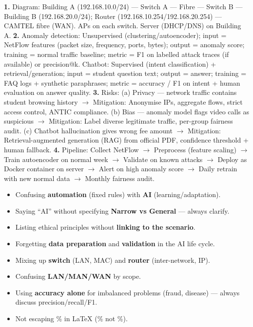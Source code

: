 \documentclass[11pt]{article}
\begin{document}
\begin{corrige}
\textbf{1.} Diagram: Building A (192.168.10.0/24) — Switch A — Fibre — Switch B — Building B (192.168.20.0/24); Router (192.168.10.254/192.168.20.254) — CAMTEL fibre (WAN). APs on each switch. Server (DHCP/DNS) on Building A.
\textbf{2.} Anomaly detection: Unsupervised (clustering/autoencoder); input = NetFlow features (packet size, frequency, ports, bytes); output = anomaly score; training = normal traffic baseline; metric = F1 on labelled attack traces (if available) or precision@k. Chatbot: Supervised (intent classification) + retrieval/generation; input = student question text; output = answer; training = FAQ logs + synthetic paraphrases; metric = accuracy / F1 on intent + human evaluation on answer quality.
\textbf{3.} Risks: (a) Privacy — network traffic contains student browsing history $\rightarrow$ Mitigation: Anonymise IPs, aggregate flows, strict access control, ANTIC compliance. (b) Bias — anomaly model flags video calls as suspicious $\rightarrow$ Mitigation: Label diverse legitimate traffic, per-group fairness audit. (c) Chatbot hallucination gives wrong fee amount $\rightarrow$ Mitigation: Retrieval-augmented generation (RAG) from official PDF, confidence threshold + human fallback.
\textbf{4.} Pipeline: Collect NetFlow $\rightarrow$ Preprocess (feature scaling) $\rightarrow$ Train autoencoder on normal week $\rightarrow$ Validate on known attacks $\rightarrow$ Deploy as Docker container on server $\rightarrow$ Alert on high anomaly score $\rightarrow$ Daily retrain with new normal data $\rightarrow$ Monthly fairness audit.
\end{corrige}

\begin{attention}
\begin{itemize}
\item Confusing \textbf{automation} (fixed rules) with \textbf{AI} (learning/adaptation).
\item Saying ``AI'' without specifying \textbf{Narrow vs General} — always clarify.
\item Listing ethical principles without \textbf{linking to the scenario}.
\item Forgetting \textbf{data preparation} and \textbf{validation} in the AI life cycle.
\item Mixing up \textbf{switch} (LAN, MAC) and \textbf{router} (inter-network, IP).
\item Confusing \textbf{LAN/MAN/WAN} by scope.
\item Using \textbf{accuracy alone} for imbalanced problems (fraud, disease) — always discuss precision/recall/F1.
\item Not escaping \% in LaTeX (\% not \%).
\end{itemize}
\end{attention}
\end{document}

